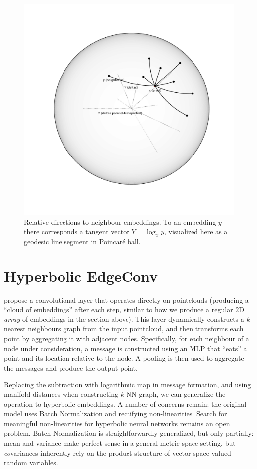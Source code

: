 \begin{figure}[ht]\center
\includegraphics[width=.9\textwidth]{art/neighbours.pdf}
\caption{Relative directions to neighbour embeddings. To an embedding \( y \)
there corresponds a tangent vector \( Y = \log_x y \), visualized here as a
geodesic line segment in Poincar\'e ball.}
\end{figure}

\section{Hyperbolic EdgeConv} \label{sec:hedgeconv}

\citet{edgeconv} propose a convolutional layer that operates directly on
pointclouds (producing a ``cloud of embeddings'' after each step, similar to
how we produce a regular \( 2 \)D \emph{array} of embeddings in the section
above). This layer dynamically constructs a \( k \)-nearest neighbours graph
from the input pointcloud, and then transforms each point by aggregating it
with adjacent nodes. Specifically, for each neighbour of a node under
consideration, a message is constructed using an MLP that ``eats'' a point and its
location relative to the node. A pooling is then used to aggregate the messages
and produce the output point.

Replacing the subtraction with logarithmic map in message formation, and using
manifold distances when constructing \( k \)-NN graph, we can generalize the
operation to hyperbolic embeddings. A number of concerns remain: the original
model uses Batch Normalization and rectifying non-linearities. Search for
meaningful non-linearities for hyperbolic neural networks remains an open
problem. Batch Normalization is straightforwardly generalized, but only
partially: mean and variance make perfect sense in a general metric space
setting, but \emph{co}variances inherently rely on the product-structure of
vector space-valued random variables.

